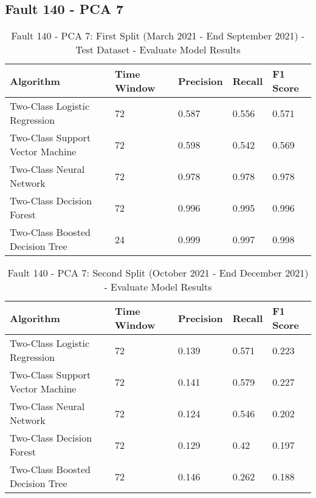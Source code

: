 \subsection{Fault 140 - PCA 7}

\begin{table}[!ht]
    \centering
    \begin{tabular}{|l|l|l|l|l|}
    \hline
        Algorithm & Time Window & Precision & Recall & F1 Score \\ \hline
        Two-Class Logistic Regression & 72 & 0.587 & 0.556 & 0.571 \\ \hline
        Two-Class Support Vector Machine & 72 & 0.598 & 0.542 & 0.569 \\ \hline
        Two-Class Neural Network & 72 & 0.978 & 0.978 & 0.978 \\ \hline
        Two-Class Decision Forest & 72 & 0.996 & 0.995 & 0.996 \\ \hline
        Two-Class Boosted Decision Tree & 24 & 0.999 & 0.997 & 0.998 \\ \hline
    \end{tabular}
    \caption{Fault 140 - PCA 7: First Split (March 2021 - End September 2021) - Test Dataset - Evaluate Model Results}
    \label{9112_SCA34_1st}
\end{table}

\begin{table}[!ht]
    \centering
    \begin{tabular}{|l|l|l|l|l|}
    \hline
        Algorithm & Time Window & Precision & Recall & F1 Score \\ \hline
        Two-Class Logistic Regression & 72 & 0.139 & 0.571 & 0.223 \\ \hline
        Two-Class Support Vector Machine & 72 & 0.141 & 0.579 & 0.227 \\ \hline
        Two-Class Neural Network & 72 & 0.124 & 0.546 & 0.202 \\ \hline
        Two-Class Decision Forest & 72 & 0.129 & 0.42 & 0.197 \\ \hline
        Two-Class Boosted Decision Tree & 72 & 0.146 & 0.262 & 0.188 \\ \hline
    \end{tabular}
    \caption{Fault 140 - PCA 7: Second Split (October 2021 - End December 2021) - Evaluate Model Results}
    \label{9112_SCA34_1st}
\end{table}

